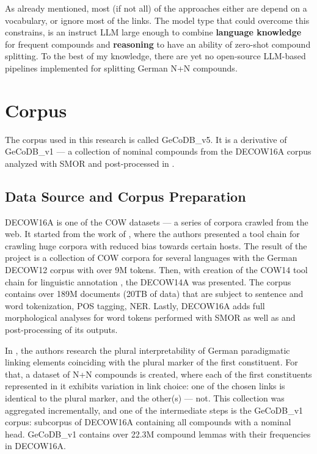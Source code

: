 \documentclass[11pt]{article}
\begin{document}
As already mentioned, most (if not all) of the approaches either are depend on a vocabulary, or ignore most of the links. The model type that could overcome this constrains, is an instruct LLM large enough to combine \textbf{language knowledge} for frequent compounds and \textbf{reasoning} to have an ability of zero-shot compound splitting. To the best of my knowledge, there are yet no open-source LLM-based pipelines implemented for splitting German N+N compounds.


\section{Corpus}
\label{sec:corpus}

The corpus used in this research is called GeCoDB\_v5. It is a derivative of GeCoDB\_v1 --- a collection of nominal compounds from the DECOW16A corpus analyzed with SMOR and post-processed in \citet{SchaferBildhauer_in_prep}.

\subsection{Data Source and Corpus Preparation}
\label{sec:corpus_prep}

DECOW16A is one of the COW datasets --- a series of corpora crawled from the web. It started from the work of \citet{SCHFER12.834}, where the authors presented a tool chain for crawling huge corpora with reduced bias towards certain hosts. The result of the project is a collection of COW corpora for several languages with the German DECOW12 corpus with over 9M tokens. Then, with creation of the COW14 tool chain for linguistic annotation \cite{Schafer2015}, the DECOW14A was presented. The corpus contains over 189M documents (20TB of data) that are subject to sentence and word tokenization, POS tagging, NER. Lastly, DECOW16A \cite{SchaferBildhauer_in_prep} adds full morphological analyses for word tokens performed with SMOR as well as and post-processing of its outputs.

In \citet{schafer_2018_1323211}, the authors research the plural interpretability of German paradigmatic linking elements coinciding with the plural marker of the first constituent. For that, a dataset of N+N compounds is created, where each of the first constituents represented in it exhibits variation in link choice: one of the chosen links is identical to the plural marker, and the other(s) --- not. This collection was aggregated incrementally, and one of the intermediate steps is the GeCoDB\_v1 corpus: subcorpus of DECOW16A containing all compounds with a nominal head. GeCoDB\_v1 contains over 22.3M compound lemmas with their frequencies in DECOW16A.
\end{document}
